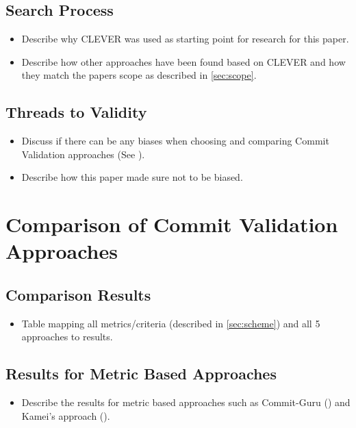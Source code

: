 \subsection{Search Process}
\begin{itemize}
	\item Describe why CLEVER was used as starting point for research for this paper. \cite{Nayrolles2018}
	\item Describe how other approaches have been found based on CLEVER and how they match the papers scope as described in \ref{sec:scope}.
\end{itemize}

\subsection{Threads to Validity}
\begin{itemize}
	\item Discuss if there can be any biases when choosing and comparing Commit Validation approaches (See \cite{Kitchenham2004}).
	\item Describe how this paper made sure not to be biased.
\end{itemize}


\section{Comparison of Commit Validation Approaches}

\subsection{Comparison Results}
\begin{itemize}
	\item Table mapping all metrics/criteria (described in \ref{sec:scheme}) and all 5 approaches to results.
\end{itemize}

\subsection{Results for Metric Based Approaches}
\begin{itemize}
	\item Describe the results for metric based approaches such as Commit-Guru (\cite{Nayrolles2018}) and Kamei's approach (\cite{Kamei2013}).
\end{itemize}
